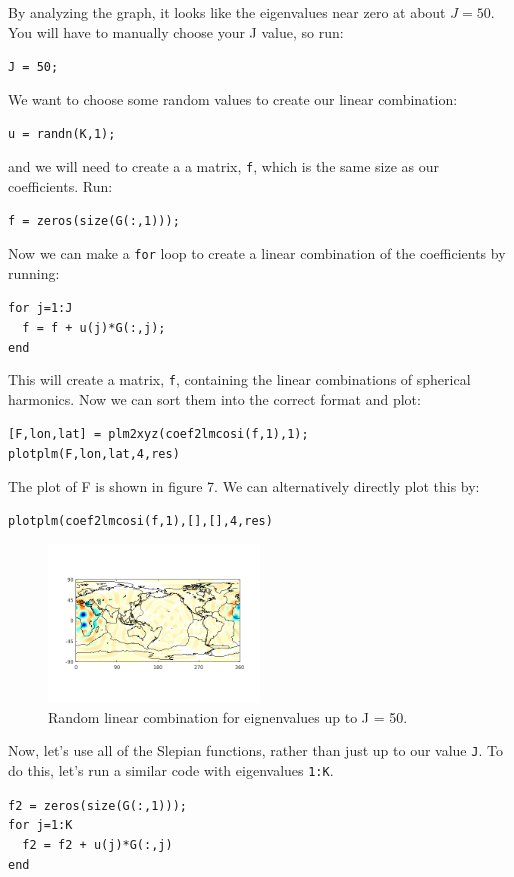\documentclass[11pt]{article}
\begin{document}
By analyzing the graph, it looks like the eigenvalues near zero at about $J=50$.  You will have to manually choose your J value, so run:

\verb+J = 50;+

We want to choose some random values to create our linear combination:

\verb|u = randn(K,1);|

and we will need to create a a matrix, \verb+f+, which is the same size as our coefficients. Run:

\verb|f = zeros(size(G(:,1)));|

Now we can make a \verb|for| loop to create a linear combination of the coefficients by running:

\verb|for j=1:J|\\
\verb|	f = f + u(j)*G(:,j);|\\
\verb|end|

This will create a matrix, \verb|f|, containing the linear combinations of spherical harmonics.  Now we can sort them into the correct format and plot:

\verb|[F,lon,lat] = plm2xyz(coef2lmcosi(f,1),1);|\\
\verb|plotplm(F,lon,lat,4,res)|

The plot of F is shown in figure 7.  We can alternatively directly plot this by:

\verb|plotplm(coef2lmcosi(f,1),[],[],4,res)|

\begin{figure}[H]
	\centering
	\includegraphics[width=0.5\textwidth]{figures/F_ml.png}
	\caption{Random linear combination for eignenvalues up to J = 50.}
\end{figure}


Now, let's use all of the Slepian functions, rather than just up to our value \verb|J|.  To do this, let's run a similar code with eigenvalues \verb|1:K|.

\verb|f2 = zeros(size(G(:,1)));|\\
\verb|for j=1:K|\\
\verb|	f2 = f2 + u(j)*G(:,j)|\\
\verb|end|
\end{document}
